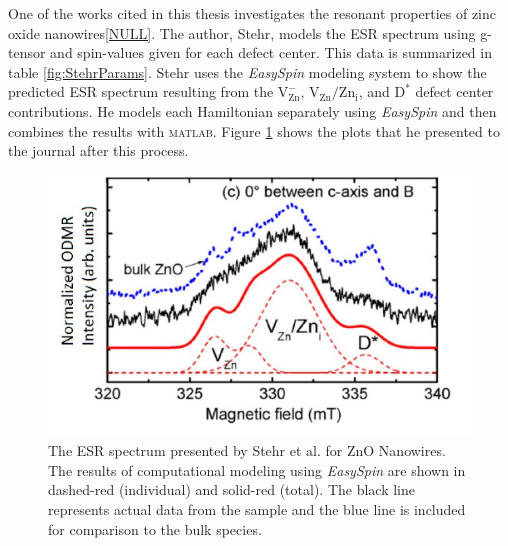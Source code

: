 \documentclass[oneside, astronomy, noacknowlegments]{BYUPhys}
\begin{document}
One of the works cited in this thesis investigates the resonant properties of zinc oxide nanowires\ref{NULL}. The author, Stehr, models the ESR spectrum using g-tensor and spin-values given for each defect center. This data is summarized in table \ref{fig:StehrParams}. Stehr uses the \textit{EasySpin} modeling system to show the predicted ESR spectrum resulting from the $\text{V}_{\text{Zn}}^{-}$, $\text{V}_{\text{Zn}}/\text{Zn}_{\text{i}}$, and $\text{D}^{*}$ defect center contributions. He models each Hamiltonian separately using \textit{EasySpin} and then combines the results with \textsc{matlab}. Figure \ref{fig:StehrPlots} shows the plots that he presented to the journal after this process.

\begin{figure}
    \centerline{\includegraphics{stehr_fig}}
    \caption[ESR Spectrum Presented by Stehr et al.]{\label{fig:StehrPlots}
     The ESR spectrum presented by Stehr et al. for ZnO Nanowires. The results of computational modeling using \textit{EasySpin} are shown in dashed-red (individual) and solid-red (total). The black line represents actual data from the sample and the blue line is included for comparison to the bulk species.}
 \end{figure}
\end{document}
